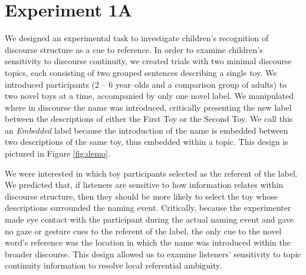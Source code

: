 \documentclass[man]{apa2}
\begin{document}
\section{Experiment 1A}

We designed an experimental task to investigate children's recognition of discourse structure as a cue to reference. In order to examine children's sensitivity to discourse continuity, we created trials with two minimal discourse topics, each consisting of two grouped sentences describing a single toy.  We introduced participants (2 -- 6 year--olds and a comparison group of adults) to two novel toys at a time, accompanied by only one novel label.  We manipulated where in discourse the name was introduced, critically presenting the new label between the descriptions of either the First Toy or the Second Toy.  We call this an \emph{Embedded} label because the introduction of the name is embedded between two descriptions of the same toy, thus embedded within a topic.  This design is pictured in Figure \ref{fig:demo}.

We were interested in which toy participants selected as the referent of the label.  We predicted that, if listeners are sensitive to how information relates within discourse structure, then they should be more likely to select the toy whose descriptions surrounded the naming event.  Critically, because the experimenter made eye contact with the participant during the actual naming event and gave no gaze or gesture cues to the referent of the label, the only cue to the novel word's reference was the location in which the name was introduced within the broader discourse.  This design allowed us to examine listeners' sensitivity to topic continuity information to resolve local referential ambiguity.  
\end{document}
